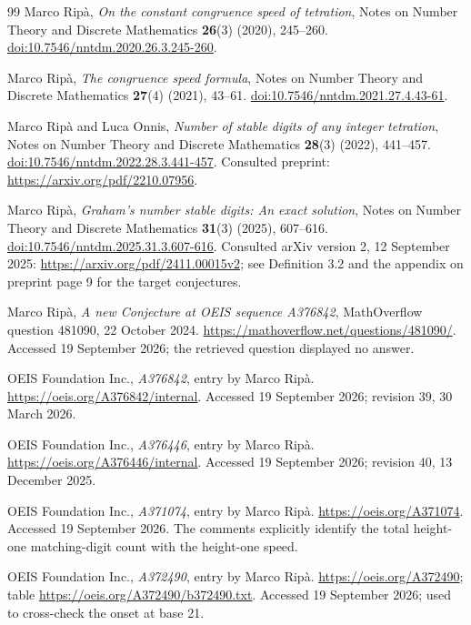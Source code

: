 \documentclass[11pt,letterpaper]{article}
\numberwithin{equation}{section}
\theoremstyle{definition}
\begin{document}
\begin{thebibliography}{99}
Marco Rip\`a, \emph{On the constant congruence speed of tetration},
Notes on Number Theory and Discrete Mathematics \textbf{26}(3) (2020), 245--260.
\href{https://doi.org/10.7546/nntdm.2020.26.3.245-260}{doi:10.7546/nntdm.2020.26.3.245-260}.

Marco Rip\`a, \emph{The congruence speed formula},
Notes on Number Theory and Discrete Mathematics \textbf{27}(4) (2021), 43--61.
\href{https://doi.org/10.7546/nntdm.2021.27.4.43-61}{doi:10.7546/nntdm.2021.27.4.43-61}.

Marco Rip\`a and Luca Onnis, \emph{Number of stable digits of any integer tetration},
Notes on Number Theory and Discrete Mathematics \textbf{28}(3) (2022), 441--457.
\href{https://doi.org/10.7546/nntdm.2022.28.3.441-457}{doi:10.7546/nntdm.2022.28.3.441-457}.
Consulted preprint: \url{https://arxiv.org/pdf/2210.07956}.

Marco Rip\`a, \emph{Graham's number stable digits: An exact solution},
Notes on Number Theory and Discrete Mathematics \textbf{31}(3) (2025), 607--616.
\href{https://doi.org/10.7546/nntdm.2025.31.3.607-616}{doi:10.7546/nntdm.2025.31.3.607-616}.
Consulted arXiv version 2, 12 September 2025:
\url{https://arxiv.org/pdf/2411.00015v2}; see Definition 3.2 and the appendix
on preprint page 9 for the target conjectures.

Marco Rip\`a, \emph{A new Conjecture at OEIS sequence A376842},
MathOverflow question 481090, 22 October 2024.
\url{https://mathoverflow.net/questions/481090/}.
Accessed 19 September 2026; the retrieved question displayed no answer.

OEIS Foundation Inc., \emph{A376842}, entry by Marco Rip\`a.
\url{https://oeis.org/A376842/internal}.
Accessed 19 September 2026; revision 39, 30 March 2026.

OEIS Foundation Inc., \emph{A376446}, entry by Marco Rip\`a.
\url{https://oeis.org/A376446/internal}.
Accessed 19 September 2026; revision 40, 13 December 2025.

OEIS Foundation Inc., \emph{A371074}, entry by Marco Rip\`a.
\url{https://oeis.org/A371074}.
Accessed 19 September 2026. The comments explicitly identify the total
height-one matching-digit count with the height-one speed.

OEIS Foundation Inc., \emph{A372490}, entry by Marco Rip\`a.
\url{https://oeis.org/A372490}; table
\url{https://oeis.org/A372490/b372490.txt}.
Accessed 19 September 2026; used to cross-check the onset at base 21.
\end{thebibliography}
\end{document}
